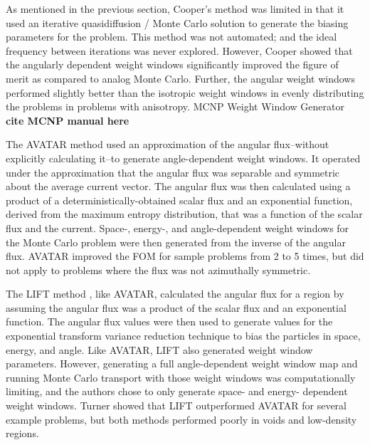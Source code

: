 As mentioned in the previous section, Cooper's method was limited in that it used an
iterative quasidiffusion / Monte Carlo solution to generate the biasing parameters for
the problem. This method was not automated; and the ideal frequency between iterations
was never explored. However, Cooper showed that the angularly dependent weight windows
significantly improved the figure of merit as compared to analog Monte Carlo.
Further, the
angular weight windows performed slightly better than the isotropic weight windows in
evenly distributing the problems in problems with anisotropy.
MCNP Weight Window Generator \textbf{cite MCNP manual here}


The AVATAR method
\cite{van_riper_generation_1995, van_riper_avatarautomatic_1997} used an
approximation of the angular flux--without explicitly calculating it--to
generate angle-dependent weight windows. It operated under the approximation
that
the angular flux was separable and symmetric about the average current vector.
The angular flux was then calculated using
a product of a deterministically-obtained
scalar flux and an exponential function, derived from the
maximum entropy distribution, that was a function of the scalar flux and the
current. Space-, energy-, and angle-dependent weight windows for
the Monte Carlo problem were then generated from the inverse of the angular
flux. AVATAR improved the FOM for sample problems from 2 to 5 times, but did not
apply to problems where the flux was not azimuthally symmetric.

The LIFT method \cite{turner_automatic_1997, turner_automatic_1997-1}, like
AVATAR, calculated the angular flux for a region by assuming the angular flux
was a product of the scalar flux and an exponential function. The angular flux
values were then used to generate values for the exponential transform variance
reduction
technique to bias the particles in space, energy, and angle. Like AVATAR, LIFT
also generated weight window parameters. However, generating a full
angle-dependent weight window map and running Monte Carlo transport with those
weight windows was computationally limiting, and the authors chose to only
generate space- and energy- dependent weight windows. Turner showed that LIFT
outperformed AVATAR for several example problems, but both methods performed
poorly in voids and low-density regions.

